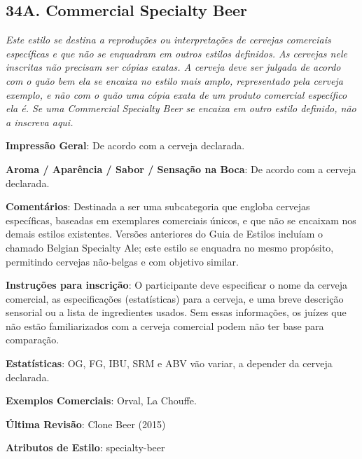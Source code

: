 \subsection*{34A. Commercial Specialty Beer}

\textit{Este estilo se destina a reproduções ou interpretações de cervejas comerciais específicas e que não se enquadram em outros estilos definidos. As cervejas nele inscritas não precisam ser cópias exatas. A cerveja deve ser julgada de acordo com o quão bem ela se encaixa no estilo mais amplo, representado pela cerveja exemplo, e não com o quão uma cópia exata de um produto comercial específico ela é. Se uma Commercial Specialty Beer se encaixa em outro estilo definido, não a inscreva aqui.}

\textbf{Impressão Geral}: De acordo com a cerveja declarada.

\textbf{Aroma / Aparência / Sabor / Sensação na Boca}: De acordo com a cerveja declarada.

\textbf{Comentários}: Destinada a ser uma subcategoria que engloba cervejas específicas, baseadas em exemplares comerciais únicos, e que não se encaixam nos demais estilos existentes. Versões anteriores do Guia de Estilos incluíam o chamado Belgian Specialty Ale; este estilo se enquadra no mesmo propósito, permitindo cervejas não-belgas e com objetivo similar.

\textbf{Instruções para inscrição}: O participante deve especificar o nome da cerveja comercial, as especificações (estatísticas) para a cerveja, e uma breve descrição sensorial ou a lista de ingredientes usados. Sem essas informações, os juízes que não estão familiarizados com a cerveja comercial podem não ter base para comparação.

\textbf{Estatísticas}: OG, FG, IBU, SRM e ABV vão variar, a depender da cerveja declarada.

\textbf{Exemplos Comerciais}: Orval, La Chouffe.

\textbf{Última Revisão}: Clone Beer (2015)

\textbf{Atributos de Estilo}: specialty-beer
